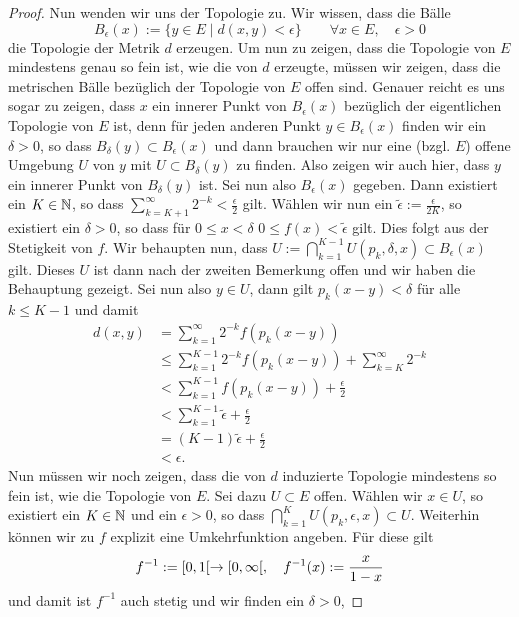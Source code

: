 \begin{proof}
  Nun wenden wir uns der Topologie zu. Wir wissen, dass die Bälle
  \[
  B_\epsilon(x) := \{ y \in E \mid d(x,y) < \epsilon \} \qquad \forall
  x \in E, \quad \epsilon > 0
  \]
  die Topologie der Metrik $d$ erzeugen. Um nun zu zeigen, dass die
  Topologie von $E$ mindestens genau so fein ist, wie die von $d$
  erzeugte, müssen wir zeigen, dass die metrischen Bälle bezüglich der
  Topologie von $E$ offen sind. Genauer reicht es uns sogar
  zu zeigen, dass $x$ ein innerer Punkt von $B_\epsilon(x)$ bezüglich
  der eigentlichen Topologie von $E$ ist, denn
  für jeden anderen Punkt $y \in B_\epsilon(x)$ finden wir ein
  $\delta >0$, so dass $B_\delta(y) \subset B_\epsilon(x)$ und dann
  brauchen wir nur eine (bzgl. $E$) offene Umgebung $U$ von $y$ mit $U
  \subset B_\delta(y)$ zu finden. Also zeigen wir auch hier, dass $y$
  ein innerer Punkt von $B_\delta(y)$ ist. Sei nun also
  $B_\epsilon(x)$ gegeben. Dann existiert ein $K \in \mathbb{N}$, so dass
  $\sum_{k=K+1}^\infty 2^{-k} < \frac{\epsilon}{2}$ gilt. Wählen wir
  nun ein $\tilde \epsilon := \frac{\epsilon}{2K}$, so  existiert ein
  $\delta > 0$, so dass für $0 \leq x < \delta$ $0 \leq f(x) < \tilde \epsilon$
  gilt. Dies folgt aus der Stetigkeit von $f$. Wir behaupten nun, dass
  $U := \bigcap_{k=1}^{K-1} U(p_k, \delta, x) \subset B_\epsilon(x)$
  gilt. Dieses $U$ ist dann nach der zweiten Bemerkung offen und wir
  haben die Behauptung gezeigt. Sei nun also $y \in U$, dann gilt
  $p_k(x-y) < \delta$ für alle $k \leq K-1$ und damit
  \begin{align*}
    d(x,y) & = \sum_{k=1}^\infty 2^{-k} f(p_k(x-y)) \\
    & \leq \sum_{k=1}^{K-1}2^{-k} f(p_k(x-y)) + \sum_{k=K}^\infty 2^{-k} \\
    & < \sum_{k=1}^{K-1} f(p_k(x-y)) + \frac{\epsilon}{2} \\
    & < \sum_{k=1}^{K-1} \tilde \epsilon + \frac{\epsilon}{2} \\
    & = (K-1) \tilde \epsilon + \frac{\epsilon}{2}\\
    & < \epsilon.
  \end{align*}
  Nun müssen wir noch zeigen, dass die von $d$ induzierte Topologie
  mindestens so fein ist, wie die Topologie von $E$. Sei dazu $U \subset
  E$ offen. Wählen wir $x \in U$, so existiert ein $K \in \mathbb{N}$ und ein
  $\epsilon > 0$, so dass $\bigcap_{k=1}^K U(p_k, \epsilon, x) \subset
  U$. Weiterhin können wir zu $f$ explizit eine Umkehrfunktion
  angeben. Für diese gilt
  \[
  f^{-1} := [0, 1[\rightarrow [0, \infty[, \quad f^{-1}(x) := \frac{x}{1-x}
  \]
  und damit ist $f^{-1}$ auch stetig und wir finden ein $\delta > 0$,

\end{proof}
